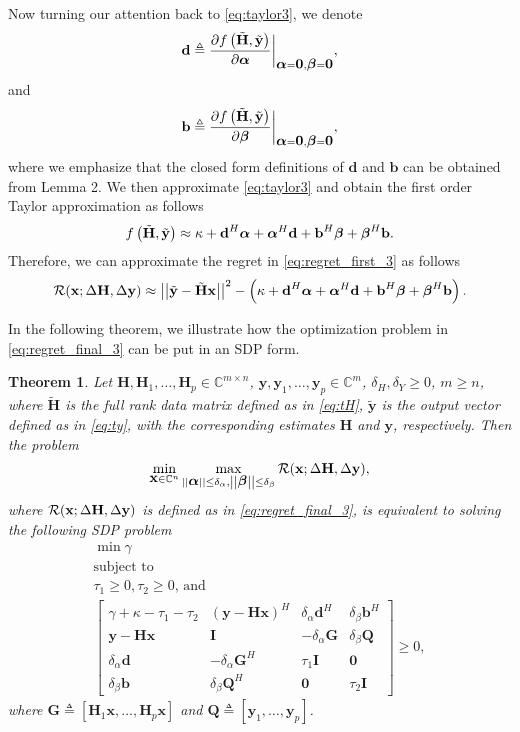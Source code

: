 \documentclass[review,sort&compress]{elsarticle}
\newtheorem{thm}{Theorem}
\renewcommand{\vec}[1]{\mbox{$\mathbf{#1}$}}
\newcommand{\norm}[1]{\left|\left|#1\right|\right|}
\newcommand{\defi}{\triangleq}
\newcommand{\nn}{\nonumber}
\newcommand{\C}{\mathbb{C}}
\newcommand{\R}{{\cal R}}
\newcommand{\vH}{\vec{H}}
\newcommand{\vx}{\vec{x}}
\newcommand{\vy}{\vec{y}}
\newcommand{\dH}{\Delta\vH}
\newcommand{\dy}{\Delta\vy}
\newcommand{\tH}{\tilde{\vec{H}}}
\newcommand{\ty}{\tilde{\vec{y}}}
\newcommand{\vd}{\vec{d}}
\newcommand{\vI}{\vec{I}}
\newcommand{\vb}{\vec{b}}
\newcommand{\vQ}{\vec{Q}}
\newcommand{\vG}{\vec{G}}
\newcommand{\va}{\mbox{\boldmath$\alpha$}}
\newcommand{\vbet}{\mbox{\boldmath$\beta$}}
\begin{document}
Now turning our attention back to \eqref{eq:taylor3}, we denote
\[
\vd \defi \dfrac{\partial f\left(\tH, \ty \right)}{\partial \va} \bigg\vert_{\va = \vec{0}, \vbet = \vec{0}},
\]
and
\[
\vb \defi \dfrac{\partial f\left(\tH, \ty \right)}{\partial \vbet} \bigg\vert_{\va = \vec{0}, \vbet = \vec{0}},
\]
where we emphasize that the closed form definitions of $\vd$ and $\vb$ can be obtained from Lemma 2. We then approximate \eqref{eq:taylor3} and obtain the first order Taylor approximation as follows
\[
f\left(\tH, \ty \right) \approx \kappa + \vd^H\va + \va^H\vd + \vb^H\vbet + \vbet^H\vb.
\]
Therefore, we can approximate the regret in \eqref{eq:regret_first_3} as follows
\begin{equation}\label{eq:regret_final_3}
  \R(\vx; \dH,\dy) \approx {\norm{\ty - \tH \vx}}^2 - \left( \kappa + \vd^H\va + \va^H\vd + \vb^H\vbet + \vbet^H\vb \right).
\end{equation}

In the following theorem, we illustrate how the optimization problem in \eqref{eq:regret_final_3} can
be put in an SDP form.

\begin{thm}\label{thm3}
Let $\vH, \vH_1, \dots, \vH_p \in \C^{m\times n}$, $\vy, \vy_1,\dots, \vy_p \in \C^{m}$, $\delta_{H}, \delta_{Y} \geq 0$, $m\geq n$, where $\tH$ is the full rank data matrix defined as in \eqref{eq:tH}, $\ty$ is the output vector defined as in \eqref{eq:ty}, with the corresponding estimates $\vH$ and $\vy$, respectively. Then the problem
\begin{equation}\label{eq:prudefthm3}
  \min_{\vx \in \C^n} \max_{\norm{\va} \leq \delta_{\alpha},\norm{\vbet} \leq \delta_{\beta}} \R(\vx; \dH,\dy),
\end{equation}
where $\R(\vx; \dH,\dy)$ is defined as in \eqref{eq:regret_final_3}, is equivalent to solving the following SDP problem
\begin{gather}\label{eq:sdp3}
  \min \gamma \nn\\
  \mbox{subject to} \nn\\
  \tau_1 \geq 0, \tau_2 \geq 0 \text{, and} \nn\\
  \begin{bmatrix}
  \gamma + \kappa - \tau_1 - \tau_2  & (\vy-\vH\vx)^H           & \delta_{\alpha} \vd^H  & \delta_{\beta} \vb^H \\
  \vy-\vH\vx                         & \vI                      & -\delta_{\alpha} \vG   & \delta_{\beta} \vQ \\
  \delta_{\alpha} \vd                & -\delta_{\alpha} \vG^H   & \tau_1 \vI             & \vec{0} \\
  \delta_{\beta} \vb                 & \delta_{\beta} \vQ^H     & \vec{0}                & \tau_2 \vI
  \end{bmatrix} \geq 0,
\end{gather}
where $\vG \defi [\vH_1\vx,\dots,\vH_p\vx]$ and $\vQ \defi [\vy_1,\dots,\vy_p]$.
\end{thm}
\end{document}
